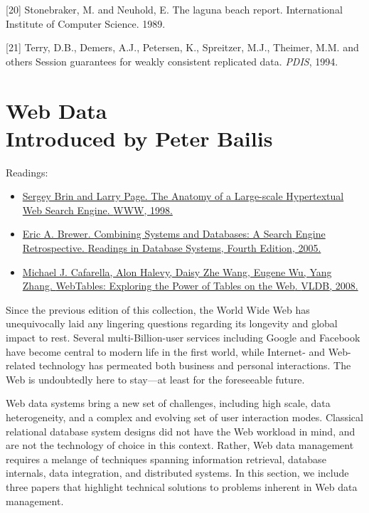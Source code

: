 \documentclass[b5paper,11pt,twoside,openright]{book}
\newcommand\Chapter[3]{
  \hypertarget{#1}{
    \chapter[#2]{#2\\{\Large #3}}\label{#1}
  }
}
\begin{document}
\leavevmode\hypertarget{ref-lagunabeach}{}%
{[}20{]} Stonebraker, M. and Neuhold, E. The laguna beach report.
International Institute of Computer Science. 1989.

\leavevmode\hypertarget{ref-bayou-session}{}%
{[}21{]} Terry, D.B., Demers, A.J., Petersen, K., Spreitzer, M.J.,
Theimer, M.M. and others Session guarantees for weakly consistent
replicated data. \emph{PDIS}, 1994.



\Chapter{ch10-webdata}{%
Web Data
}{%
Introduced by Peter Bailis
}

\begin{framed}
Readings:
\begin{itemize}
\item
\href{https://scholar.google.com/scholar?cluster=9820961755208603037}{Sergey
  Brin and Larry Page. {The Anatomy of a Large-scale Hypertextual Web
    Search Engine}. {WWW}, 1998.}
\item
\href{https://scholar.google.com/scholar?cluster=15869287167041695406}{Eric
  A. Brewer. {Combining Systems and Databases: A Search Engine
    Retrospective}. {Readings in Database Systems, Fourth Edition}, 2005.}
\item
\href{https://scholar.google.com/scholar?cluster=11659194181134800008}{Michael
  J. Cafarella, Alon Halevy, Daisy Zhe Wang, Eugene Wu, Yang Zhang.
  {WebTables: Exploring the Power of Tables on the Web}. {VLDB}, 2008.}
\end{itemize}
\end{framed}

Since the previous edition of this collection, the World Wide Web has
unequivocally laid any lingering questions regarding its longevity and
global impact to rest. Several multi-Billion-user services including
Google and Facebook have become central to modern life in the first
world, while Internet- and Web-related technology has permeated both
business and personal interactions. The Web is undoubtedly here to
stay---at least for the foreseeable future.

Web data systems bring a new set of challenges, including high scale,
data heterogeneity, and a complex and evolving set of user interaction
modes. Classical relational database system designs did not have the Web
workload in mind, and are not the technology of choice in this context.
Rather, Web data management requires a melange of techniques spanning
information retrieval, database internals, data integration, and
distributed systems. In this section, we include three papers that
highlight technical solutions to problems inherent in Web data
management.
\end{document}
